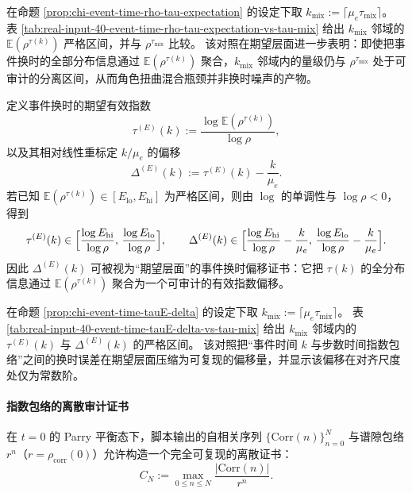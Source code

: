\begin{remark}
\label{cor:chi-event-time-rho-tau-expectation-vs-tau-mix}
在命题 \ref{prop:chi-event-time-rho-tau-expectation} 的设定下取 $k_{\mathrm{mix}}:=\lceil\mu_e\tau_{\mathrm{mix}}\rceil$。
表 \ref{tab:real-input-40-event-time-rho-tau-expectation-vs-tau-mix} 给出 $k_{\mathrm{mix}}$ 邻域的 $\mathbb{E}(\rho^{\tau(k)})$ 严格区间，并与 $\rho^{\tau_{\mathrm{mix}}}$ 比较。
该对照在期望层面进一步表明：即使把事件换时的全部分布信息通过 $\mathbb{E}(\rho^{\tau(k)})$ 聚合，$k_{\mathrm{mix}}$ 邻域内的量级仍与 $\rho^{\tau_{\mathrm{mix}}}$ 处于可审计的分离区间，从而角色扭曲混合瓶颈并非换时噪声的产物。
\end{remark}



\begin{remark}
\label{prop:chi-event-time-tauE-delta}
定义事件换时的期望有效指数
$$
\tau^{(E)}(k):=\frac{\log\mathbb{E}(\rho^{\tau(k)})}{\log\rho},
$$
以及其相对线性重标定 $k/\mu_e$ 的偏移
$$
\Delta^{(E)}(k):=\tau^{(E)}(k)-\frac{k}{\mu_e}.
$$
若已知 $\mathbb{E}(\rho^{\tau(k)})\in[E_{\mathrm{lo}},E_{\mathrm{hi}}]$ 为严格区间，则由 $\log$ 的单调性与 $\log\rho<0$，得到
$$
\tau^{(E)}(k)\in\Bigl[\frac{\log E_{\mathrm{hi}}}{\log\rho},\,\frac{\log E_{\mathrm{lo}}}{\log\rho}\Bigr],
\qquad
\Delta^{(E)}(k)\in\Bigl[\frac{\log E_{\mathrm{hi}}}{\log\rho}-\frac{k}{\mu_e},\,\frac{\log E_{\mathrm{lo}}}{\log\rho}-\frac{k}{\mu_e}\Bigr].
$$
因此 $\Delta^{(E)}(k)$ 可被视为“期望层面”的事件换时偏移证书：它把 $\tau(k)$ 的全分布信息通过 $\mathbb{E}(\rho^{\tau(k)})$ 聚合为一个可审计的有效指数偏移。
\end{remark}

\begin{remark}
\label{cor:chi-event-time-tauE-delta-vs-tau-mix}
在命题 \ref{prop:chi-event-time-tauE-delta} 的设定下取 $k_{\mathrm{mix}}:=\lceil\mu_e\tau_{\mathrm{mix}}\rceil$。
表 \ref{tab:real-input-40-event-time-tauE-delta-vs-tau-mix} 给出 $k_{\mathrm{mix}}$ 邻域内的 $\tau^{(E)}(k)$ 与 $\Delta^{(E)}(k)$ 的严格区间。
该对照把“事件时间 $k$ 与步数时间指数包络”之间的换时误差在期望层面压缩为可复现的偏移量，并显示该偏移在对齐尺度处仅为常数阶。
\end{remark}



\paragraph{指数包络的离散审计证书}
在 $t=0$ 的 Parry 平衡态下，脚本输出的自相关序列 $\{\mathrm{Corr}(n)\}_{n=0}^N$ 与谱隙包络 $r^n$（$r=\rho_{\mathrm{corr}}(0)$）允许构造一个完全可复现的离散证书：
\[
C_N:=\max_{0\le n\le N}\frac{|\mathrm{Corr}(n)|}{r^n}.
\]
